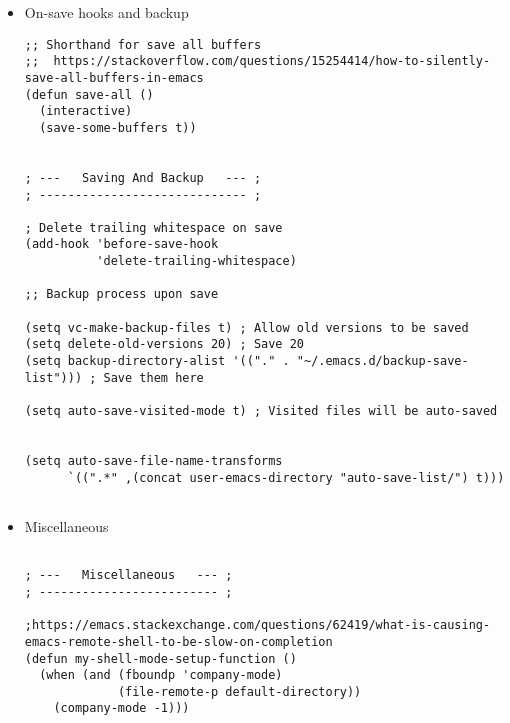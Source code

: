 \documentclass{article}
\begin{document}
\begin{itemize}
\begin{itemize}
\begin{verbatim}
; ---   ASCII Arrows   --- ;
; ------------------------ ;

(global-set-key (kbd "C-<right>") (lambda () (interactive) (insert "\u2192")))
(global-set-key (kbd "C-<up>") (lambda () (interactive) (insert "\u2191")))

; ---   Disable Keys   --- ;
; ------------------------ ;

;; Minimize
(global-unset-key (kbd "C-z"))
;; Print
(global-unset-key (kbd "s-p"))

(global-set-key (kbd "C-S-n")
                (lambda () (interactive) (next-line 10)))
(global-set-key (kbd "C-S-p")
                (lambda () (interactive) (next-line -10)))

\end{verbatim}
\item On-save hooks and backup
\label{sec:org5716d47}
\begin{verbatim}
;; Shorthand for save all buffers
;;  https://stackoverflow.com/questions/15254414/how-to-silently-save-all-buffers-in-emacs
(defun save-all ()
  (interactive)
  (save-some-buffers t))


; ---   Saving And Backup   --- ;
; ----------------------------- ;

; Delete trailing whitespace on save
(add-hook 'before-save-hook
          'delete-trailing-whitespace)

;; Backup process upon save

(setq vc-make-backup-files t) ; Allow old versions to be saved
(setq delete-old-versions 20) ; Save 20
(setq backup-directory-alist '(("." . "~/.emacs.d/backup-save-list"))) ; Save them here

(setq auto-save-visited-mode t) ; Visited files will be auto-saved


(setq auto-save-file-name-transforms
      `((".*" ,(concat user-emacs-directory "auto-save-list/") t)))


\end{verbatim}

\item Miscellaneous
\label{sec:org4e9e08e}
\begin{verbatim}

; ---   Miscellaneous   --- ;
; ------------------------- ;

;https://emacs.stackexchange.com/questions/62419/what-is-causing-emacs-remote-shell-to-be-slow-on-completion
(defun my-shell-mode-setup-function ()
  (when (and (fboundp 'company-mode)
             (file-remote-p default-directory))
    (company-mode -1)))


\end{verbatim}
\end{itemize}
\end{itemize}
\end{document}
